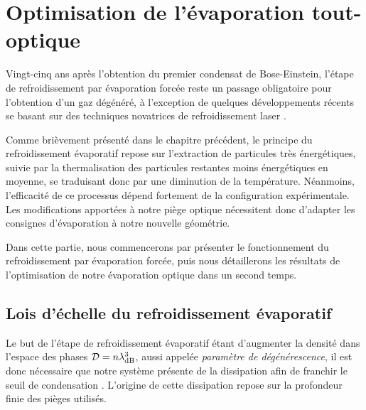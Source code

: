 \section{Optimisation de l'évaporation tout-optique}
\label{sc:evap_optique}
Vingt-cinq ans après l'obtention du premier condensat de Bose-Einstein, l'étape de refroidissement par évaporation forcée reste un passage obligatoire pour l'obtention d'un gaz dégénéré, à l'exception de quelques développements récents se basant sur des techniques novatrices de refroidissement laser \citep{hu2017creation,stellmer2013laser}. 

Comme brièvement présenté dans le chapitre précédent, le principe du refroidissement évaporatif repose sur l'extraction de particules très énergétiques, suivie par la thermalisation des particules restantes moins énergétiques en moyenne, se traduisant donc par une diminution de la température. Néanmoins, l'efficacité de ce processus dépend fortement de la configuration expérimentale. Les modifications apportées à notre piège optique nécessitent donc d'adapter les consignes d'évaporation à notre nouvelle géométrie. %

Dans cette partie, nous commencerons par présenter le fonctionnement du refroidissement par évaporation forcée, puis nous détaillerons les résultats de l'optimisation de notre évaporation optique dans un second temps.


\subsection{Lois d'échelle du refroidissement évaporatif}
\label{sc:scaling_laws_ohara}
Le but de l'étape de refroidissement évaporatif étant d'augmenter la densité dans l'espace des phases $\mathcal{D}=n \lambda_{\mathrm{dB}}^3$, aussi appelée \emph{paramètre de dégénérescence}, il est donc nécessaire que notre système présente de la dissipation afin de franchir le seuil de condensation \citep{metcalf2007laser}. L'origine de cette dissipation repose sur la profondeur finie des pièges utilisés.  

